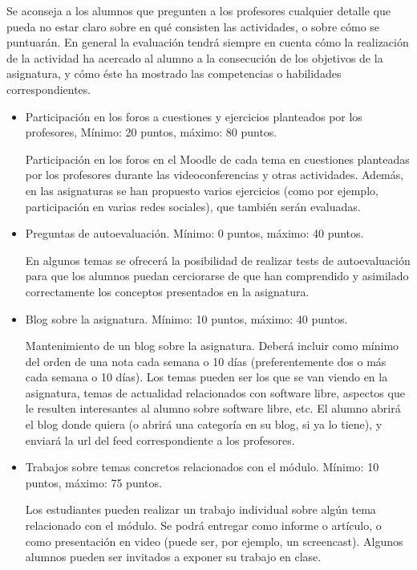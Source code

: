 \documentclass[a4paper,12pt]{article}
\begin{document}
Se aconseja a los alumnos que pregunten a los profesores cualquier detalle que pueda no estar claro sobre en qué consisten las actividades, o sobre cómo se puntuarán. En general la evaluación tendrá siempre en cuenta cómo la realización de la actividad ha acercado al alumno a la consecución de los objetivos de la asignatura, y cómo éste ha mostrado las competencias o habilidades correspondientes.

\begin{itemize}
\item Participación en los foros a cuestiones y ejercicios planteados por los profesores,  Mínimo: 20 puntos, máximo: 80 puntos.

Participación en los foros en el Moodle de cada tema en cuestiones planteadas por los profesores durante las videoconferencias y otras actividades. Además, en las asignaturas se han propuesto varios ejercicios (como por ejemplo, participación en varias redes sociales), que también serán evaluadas.

\item Preguntas de autoevaluación. Mínimo: 0 puntos, máximo: 40 puntos.

En algunos temas se ofrecerá la posibilidad de realizar tests de autoevaluación para que los alumnos puedan cerciorarse de que han comprendido y asimilado correctamente los conceptos presentados en la asignatura.

\item Blog sobre la asignatura. Mínimo: 10 puntos, máximo: 40 puntos.

Mantenimiento de un blog sobre la asignatura. Deberá incluir como mínimo del orden de una nota cada semana o 10 días (preferentemente dos o más cada semana o 10 días). Los temas pueden ser los que se van viendo en la asignatura, temas de actualidad relacionados con software libre, aspectos que le resulten interesantes al alumno sobre software libre, etc. El alumno abrirá el blog donde quiera (o abrirá una categoría en su blog, si ya lo tiene), y enviará la url del feed correspondiente a los profesores.


\item Trabajos sobre temas concretos relacionados con el módulo. Mínimo: 10 puntos, máximo: 75 puntos.

Los estudiantes pueden realizar un trabajo individual sobre algún tema relacionado con el módulo. Se podrá entregar como informe o artículo, o como presentación en video (puede ser, por ejemplo, un screencast). Algunos alumnos pueden ser invitados a exponer su trabajo en clase.



\end{itemize}
\end{document}

